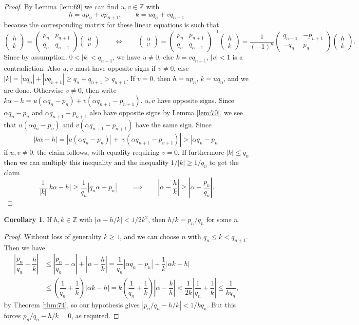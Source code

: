 \documentclass{article}
\newcommand{\Z}{\mathbb{Z}}
\newcommand{\rb}[1]{\left( #1 \right)}
\newcommand{\abs}[1]{\left\lvert #1 \right\rvert}
\newcommand{\two}[2]{\begin{pmatrix} #1 \\ #2 \end{pmatrix}}
\theoremstyle{definition}\newtheorem{definition}{Definition}
\theoremstyle{definition}\newtheorem{remark}[definition]{Remark}
\theoremstyle{definition}\newtheorem*{example}{Example}
\theoremstyle{definition}\newtheorem*{note}{Note}
\newtheorem{corollary}[definition]{Corollary}
\begin{document}
\begin{proof}
By Lemma \ref{lem:69} we can find $ u, v \in \Z $ with
$$ h = up_n + vp_{n + 1}, \qquad k = uq_n + vq_{n + 1} $$
because the corresponding matrix for these linear equations is such that
$$ \two{h}{k} = \two{p_n & p_{n + 1}}{q_n & q_{n + 1}}\two{u}{v} \qquad \iff \qquad \two{u}{v} = \two{p_n & p_{n + 1}}{q_n & q_{n + 1}}^{-1}\two{h}{k} = \dfrac{1}{\rb{-1}^n}\two{q_{n + 1} & -p_{n + 1}}{-q_n & p_n}\two{h}{k}. $$
Since by assumption, $ 0 < \abs{k} < q_{n + 1} $, we have $ u \ne 0 $, else $ k = vq_{n + 1} $, $ \abs{v} < 1 $ is a contradiction. Also $ u, v $ must have opposite signs if $ v \ne 0 $, else $ \abs{k} = \abs{uq_n} + \abs{vq_{n + 1}} \ge q_n + q_{n + 1} > q_{n + 1} $. If $ v = 0 $, then $ h = up_n $, $ k = uq_n $, and we are done. Otherwise $ v \ne 0 $, then write $ k\alpha - h = u\rb{\alpha q_n - p_n} + v\rb{\alpha q_{n + 1} - p_{n + 1}} $. $ u, v $ have opposite signs. Since $ \alpha q_n - p_n $ and $ \alpha q_{n + 1} - p_{n + 1} $ also have opposite signs by Lemma \ref{lem:70}, we see that $ u\rb{\alpha q_n - p_n} $ and $ v\rb{\alpha q_{n + 1} - p_{n + 1}} $ have the same sign. Since
$$ \abs{k\alpha - h} = \abs{u\rb{\alpha q_n - p_n}} + \abs{v\rb{\alpha q_{n + 1} - p_{n + 1}}} > \abs{\alpha q_n - p_n} $$
if $ u, v \ne 0 $, the claim follows, with equality requiring $ v = 0 $. If furthermore $ \abs{k} \le q_n $ then we can multiply this inequality and the inequality $ 1 / \abs{k} \ge 1 / q_n $ to get the claim
$$ \dfrac{1}{\abs{k}}\abs{k\alpha - h} \ge \dfrac{1}{q_n}\abs{q_n\alpha - p_n} \qquad \implies \qquad \abs{\alpha - \dfrac{h}{k}} \ge \abs{\alpha - \dfrac{p_n}{q_n}}. $$
\end{proof}

\begin{corollary}
\label{cor:75}
If $ h, k \in \Z $ with $ \abs{\alpha - h / k} < 1 / 2k^2 $, then $ h / k = p_n / q_n $ for some $ n $.
\end{corollary}

\begin{proof}
Without loss of generality $ k \ge 1 $, and we can choose $ n $ with $ q_n \le k < q_{n + 1} $. Then we have
\begin{align*}
\abs{\dfrac{p_n}{q_n} - \dfrac{h}{k}}
& \le \abs{\dfrac{p_n}{q_n} - \alpha} + \abs{\alpha - \dfrac{h}{k}}
= \dfrac{1}{q_n}\abs{\alpha q_n - p_n} + \dfrac{1}{k}\abs{\alpha k - h} \\
& \le \rb{\dfrac{1}{q_n} + \dfrac{1}{k}}\abs{\alpha k - h}
= k\rb{\dfrac{1}{q_n} + \dfrac{1}{k}}\abs{\alpha - \dfrac{k}{h}}
< \dfrac{1}{2k}\abs{\dfrac{1}{q_n} + \dfrac{1}{k}}
\le \dfrac{1}{kq_n},
\end{align*}
by Theorem \ref{thm:74}, so our hypothesis gives $ \abs{p_n / q_n - h / k} < 1 / kq_n $. But this forces $ p_n / q_n - h / k = 0 $, as required.
\end{proof}
\end{document}
